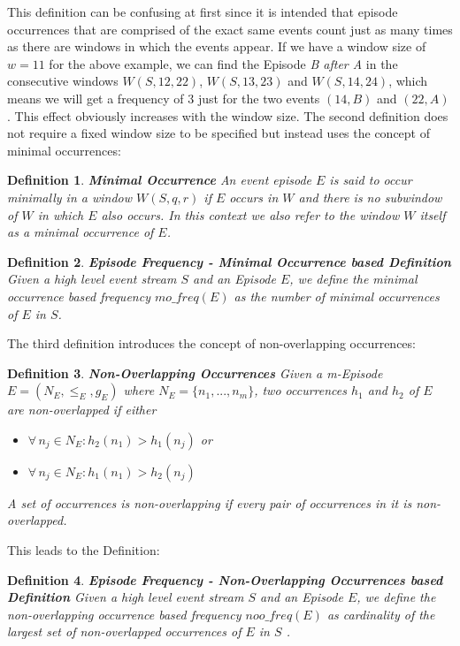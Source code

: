 \documentclass[journal]{IEEEtran}
\newtheorem{mydef}{Definition}
\begin{document}
This definition can be confusing at first since it is intended that episode occurrences that are comprised of the exact same events count just as many times as there are windows in which the events appear. If we have a window size of $w=11$ for the above example, we can find the Episode \textit{B after A} in the consecutive windows $W(S,12,22)$, $W(S,13,23)$ and $W(S,14,24)$, which means we will get a frequency of $3$ just for the two events $(14,B)$ and $(22,A)$. This effect obviously increases with the window size. \newline
The second definition does not require a fixed window size to be specified but instead uses the concept of minimal occurrences:

\begin{mydef}
\textbf{Minimal Occurrence} An event episode $E$ is said to occur minimally in a window $W(S,q,r)$ if $E$ occurs in $W$ and there is no subwindow of $W$ in which $E$ also occurs. In this context we also refer to the window $W$ itself as a minimal occurrence of $E$.
\end{mydef}

\begin{mydef}
\textbf{Episode Frequency - Minimal Occurrence based Definition} Given a high level event stream $S$ and an Episode $E$, we define the minimal occurrence based frequency $mo\_freq(E)$ as the number of minimal occurrences of $E$ in $S$.
\end{mydef}

The third definition introduces the concept of non-overlapping occurrences:

\begin{mydef}
\textbf{Non-Overlapping Occurrences} Given a m-Episode $E = (N_E,{\leq}_{E},g_E)$ where $N_E = \{n_1,...,n_m\}$, two occurrences $h_1$ and $h_2$ of $E$ are non-overlapped if either 
\begin{itemize}
	\item $\forall \, n_j \in N_E : h_2(n_1)>h_1(n_j)$ or 
	\item $\forall \, n_j \in N_E : h_1(n_1)>h_2(n_j)$
\end{itemize}
A set of occurrences is non-overlapping if every pair of occurrences in it is non-overlapped.
\end{mydef}

This leads to the Definition:

\begin{mydef}
\textbf{Episode Frequency - Non-Overlapping Occurrences based Definition} Given a high level event stream $S$ and an Episode $E$, we define the non-overlapping occurrence based frequency $noo\_freq(E)$ as cardinality of the largest set of non-overlapped occurrences of $E$ in $S$ \cite{fastEpisodeMining}.
\end{mydef}
\end{document}
